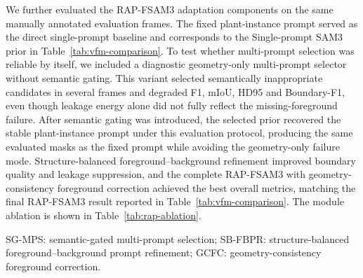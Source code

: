\documentclass[a4paper]{cas-sc}
\begin{document}
We further evaluated the RAP-FSAM3 adaptation components on the same manually annotated evaluation frames. The fixed plant-instance prompt served as the direct single-prompt baseline and corresponds to the Single-prompt SAM3 prior in Table~\ref{tab:vfm-comparison}. To test whether multi-prompt selection was reliable by itself, we included a diagnostic geometry-only multi-prompt selector without semantic gating. This variant selected semantically inappropriate candidates in several frames and degraded F1, mIoU, HD95 and Boundary-F1, even though leakage energy alone did not fully reflect the missing-foreground failure. After semantic gating was introduced, the selected prior recovered the stable plant-instance prompt under this evaluation protocol, producing the same evaluated masks as the fixed prompt while avoiding the geometry-only failure mode. Structure-balanced foreground--background refinement improved boundary quality and leakage suppression, and the complete RAP-FSAM3 with geometry-consistency foreground correction achieved the best overall metrics, matching the final RAP-FSAM3 result reported in Table~\ref{tab:vfm-comparison}. The module ablation is shown in Table~\ref{tab:rap-ablation}.

\begin{table}[pos=!htbp]
\caption{Ablation of RAP-FSAM3 adaptation components on the same manually annotated evaluation frames. The geometry-only selector is a diagnostic variant used to evaluate the necessity of semantic-gated multi-prompt selection. The fixed plant-instance prompt and the full RAP-FSAM3 correspond to the shared baseline and final method in Table~\ref{tab:vfm-comparison}.}\label{tab:rap-ablation}
\centering
\scriptsize
\setlength{\tabcolsep}{3pt}
\begin{flushleft}
\scriptsize SG-MPS: semantic-gated multi-prompt selection; SB-FBPR: structure-balanced foreground--background prompt refinement; GCFC: geometry-consistency foreground correction.
\end{flushleft}
\end{table}
\end{document}
